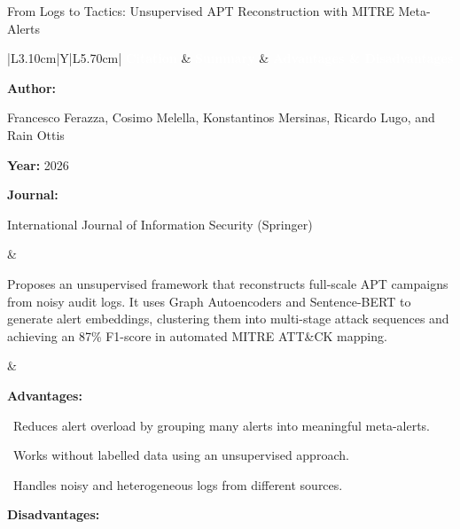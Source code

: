 \documentclass[aspectratio=169,10pt]{beamer}
\newcommand{\lrhdr}{%
  \rowcolor{prismNavy}%
  {\scriptsize\textcolor{white}{\textbf{Citation}}} &
  {\scriptsize\textcolor{white}{\textbf{Summary}}} &
  {\scriptsize\textcolor{white}{\textbf{Advantages \& Disadvantages}}} \\}
\begin{document}
\begin{frame}[t]{From Logs to Tactics: Unsupervised APT Reconstruction with MITRE Meta-Alerts}
\vspace{-0.30em}
{\footnotesize\setlength{\tabcolsep}{3.5pt}\renewcommand{\arraystretch}{1.10}
\begin{tabularx}{\textwidth}{|L{3.10cm}|Y|L{5.70cm}|}
\hline\lrhdr\hline
\begin{minipage}[t]{\linewidth}\fontsize{7.2pt}{9.2pt}\raggedright\selectfont
\textbf{Author:}\par
Francesco Ferazza, Cosimo Melella, Konstantinos Mersinas, Ricardo Lugo, and Rain Ottis\par\vspace{4pt}
\textbf{Year:} 2026\par\vspace{4pt}
\textbf{Journal:}\par
International Journal of Information Security (Springer)\par\vspace{4pt}
\end{minipage}
&
\begin{minipage}[t]{\linewidth}\fontsize{7.2pt}{9.2pt}\raggedright\selectfont
Proposes an unsupervised framework that reconstructs full-scale APT campaigns from noisy audit logs. It uses Graph Autoencoders and Sentence-BERT to generate alert embeddings, clustering them into multi-stage attack sequences and achieving an 87\% F1-score in automated MITRE ATT\&CK mapping.\par\vspace{4pt}
\end{minipage}
&
\begin{minipage}[t]{\linewidth}\fontsize{6.8pt}{8.4pt}\raggedright\selectfont
\textcolor{strengthGreen}{\textbf{Advantages:}}\par\vspace{1.3pt}
\textbullet~Reduces alert overload by grouping many alerts into meaningful meta-alerts.\par\vspace{1.8pt}\textbullet~Works without labelled data using an unsupervised approach.\par\vspace{1.8pt}\textbullet~Handles noisy and heterogeneous logs from different sources.\par\vspace{3.2pt}
\textcolor{limitRed}{\textbf{Disadvantages:}}\par\vspace{1.3pt}

\end{minipage}
\end{tabularx}}
\end{frame}
\end{document}
